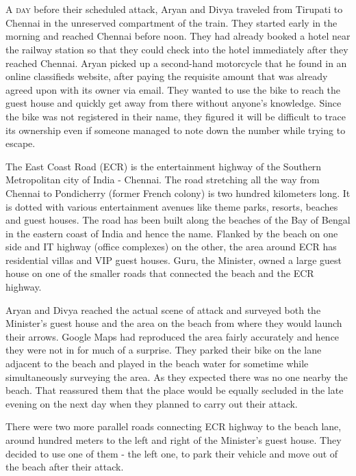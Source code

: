 \chapter{}

\lettrine{A}{ day} before their scheduled attack, Aryan and Divya traveled from Tirupati to
Chennai in the unreserved compartment of the train. They started early in the
morning and reached Chennai before noon. They had already booked a hotel near
the railway station so that they could check into the hotel immediately after
they reached Chennai. Aryan picked up a second-hand motorcycle that he found in
an online classifieds website, after paying the requisite amount that was
already agreed upon with its owner via email. They wanted to use the bike to
reach the guest house and quickly get away from there without anyone's
knowledge. Since the bike was not registered in their name, they figured it will
be difficult to trace its ownership even if someone managed to note down the
number while trying to escape.

The East Coast Road (ECR) is the entertainment highway of the Southern
Metropolitan city of India - Chennai. The road stretching all the way from
Chennai to Pondicherry (former French colony) is two hundred kilometers long. It
is dotted with various entertainment avenues like theme parks, resorts, beaches
and guest houses. The road has been built along the beaches of the Bay of Bengal
in the eastern coast of India and hence the name. Flanked by the beach on one
side and IT highway (office complexes) on the other, the area around ECR has
residential villas and VIP guest houses. Guru, the Minister, owned a large guest
house on one of the smaller roads that connected the beach and the ECR highway.

Aryan and Divya reached the actual scene of attack and surveyed both the
Minister's guest house and the area on the beach from where they would launch
their arrows. Google Maps had reproduced the area fairly accurately and hence
they were not in for much of a surprise. They parked their bike on the lane
adjacent to the beach and played in the beach water for sometime while
simultaneously surveying the area. As they expected there was no one nearby the
beach. That reassured them that the place would be equally secluded in the late
evening on the next day when they planned to carry out their attack.

There were two more parallel roads connecting ECR highway to the beach lane,
around hundred meters to the left and right of the Minister's guest house. They
decided to use one of them - the left one, to park their vehicle and move out of
the beach after their attack.

